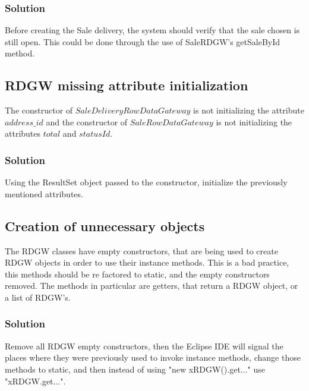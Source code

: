 \documentclass[12pt]{article}
\begin{document}
\subsubsection{Solution}
Before creating the Sale delivery, the system should verify that the sale chosen is still open. This could be done through the use of SaleRDGW's getSaleById method.

\subsection{RDGW missing attribute initialization}
The constructor of $SaleDeliveryRowDataGateway$ is not initializing the attribute $address\_id$ and the constructor of $SaleRowDataGateway$ is not initializing the attributes $total$ and $statusId$. 


\subsubsection{Solution}
Using the ResultSet object passed to the constructor, initialize the previously mentioned attributes.
\newpage
\subsection{Creation of unnecessary objects}
The RDGW classes have empty constructors, that are being used to create RDGW objects in order to use their instance methods. This is a bad practice, this methods should be re factored to static, and the empty constructors removed. The methods in particular are getters, that return a RDGW object, or a list of RDGW's. 


\subsubsection{Solution}
Remove all RDGW empty constructors, then the Eclipse IDE will signal the places where they were previously used to invoke instance methods, change those methods to static, and then instead of using "new xRDGW().get..." use "xRDGW.get...".





\end{document}
